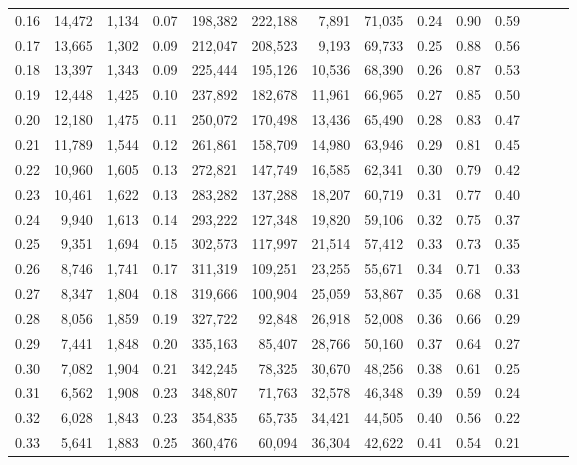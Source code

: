 \begin{tabular}{rrrrrrrrrrrrrr}
0.16 &  14,472 &  1,134 &  0.07 &  198,382 &  222,188 &   7,891 &  71,035 &  0.24 &  0.90 &      0.59 \\
0.17 &  13,665 &  1,302 &  0.09 &  212,047 &  208,523 &   9,193 &  69,733 &  0.25 &  0.88 &      0.56 \\
0.18 &  13,397 &  1,343 &  0.09 &  225,444 &  195,126 &  10,536 &  68,390 &  0.26 &  0.87 &      0.53 \\
0.19 &  12,448 &  1,425 &  0.10 &  237,892 &  182,678 &  11,961 &  66,965 &  0.27 &  0.85 &      0.50 \\
0.20 &  12,180 &  1,475 &  0.11 &  250,072 &  170,498 &  13,436 &  65,490 &  0.28 &  0.83 &      0.47 \\
0.21 &  11,789 &  1,544 &  0.12 &  261,861 &  158,709 &  14,980 &  63,946 &  0.29 &  0.81 &      0.45 \\
0.22 &  10,960 &  1,605 &  0.13 &  272,821 &  147,749 &  16,585 &  62,341 &  0.30 &  0.79 &      0.42 \\
0.23 &  10,461 &  1,622 &  0.13 &  283,282 &  137,288 &  18,207 &  60,719 &  0.31 &  0.77 &      0.40 \\
0.24 &   9,940 &  1,613 &  0.14 &  293,222 &  127,348 &  19,820 &  59,106 &  0.32 &  0.75 &      0.37 \\
0.25 &   9,351 &  1,694 &  0.15 &  302,573 &  117,997 &  21,514 &  57,412 &  0.33 &  0.73 &      0.35 \\
0.26 &   8,746 &  1,741 &  0.17 &  311,319 &  109,251 &  23,255 &  55,671 &  0.34 &  0.71 &      0.33 \\
0.27 &   8,347 &  1,804 &  0.18 &  319,666 &  100,904 &  25,059 &  53,867 &  0.35 &  0.68 &      0.31 \\
0.28 &   8,056 &  1,859 &  0.19 &  327,722 &   92,848 &  26,918 &  52,008 &  0.36 &  0.66 &      0.29 \\
0.29 &   7,441 &  1,848 &  0.20 &  335,163 &   85,407 &  28,766 &  50,160 &  0.37 &  0.64 &      0.27 \\
0.30 &   7,082 &  1,904 &  0.21 &  342,245 &   78,325 &  30,670 &  48,256 &  0.38 &  0.61 &      0.25 \\
0.31 &   6,562 &  1,908 &  0.23 &  348,807 &   71,763 &  32,578 &  46,348 &  0.39 &  0.59 &      0.24 \\
0.32 &   6,028 &  1,843 &  0.23 &  354,835 &   65,735 &  34,421 &  44,505 &  0.40 &  0.56 &      0.22 \\
0.33 &   5,641 &  1,883 &  0.25 &  360,476 &   60,094 &  36,304 &  42,622 &  0.41 &  0.54 &      0.21 \\

\end{tabular}
